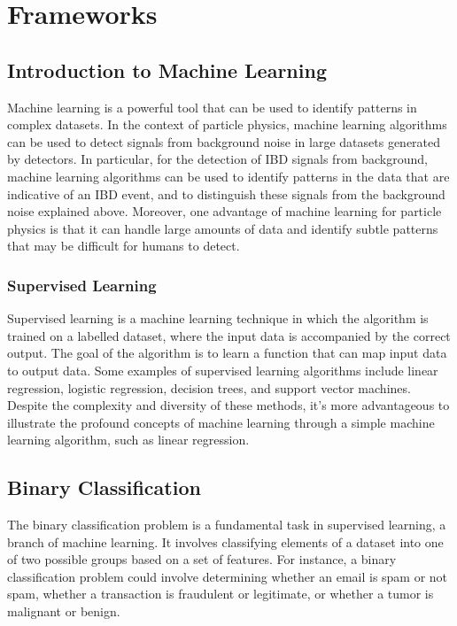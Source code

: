 \chapter{Frameworks}
\section{Introduction to Machine Learning}

Machine learning is a powerful tool that can be used to identify patterns in complex datasets. In the context of particle physics, machine learning algorithms can be used to detect signals from background noise in large datasets generated by detectors. In particular, for the detection of IBD signals from background, machine learning algorithms can be used to identify patterns in the data that are indicative of an IBD event, and to distinguish these signals from the background noise explained above. Moreover, one advantage of machine learning for particle physics is that it can handle large amounts of data and identify subtle patterns that may be difficult for humans to detect.
\\


\subsection{Supervised Learning}

Supervised learning is a machine learning technique in which the algorithm is trained on a labelled dataset, where the input data is accompanied by the correct output. The goal of the algorithm is to learn a function that can map input data to output data. Some examples of supervised learning algorithms include linear regression, logistic regression, decision trees, and support vector machines. Despite the complexity and diversity of these methods, it's more advantageous to illustrate the profound concepts of machine learning through a simple machine learning algorithm, such as linear regression. 



\section{Binary Classification}
The binary classification problem is a fundamental task in supervised learning, a branch of machine learning. It involves classifying elements of a dataset into one of two possible groups based on a set of features. For instance, a binary classification problem could involve determining whether an email is spam or not spam, whether a transaction is fraudulent or legitimate, or whether a tumor is malignant or benign.


